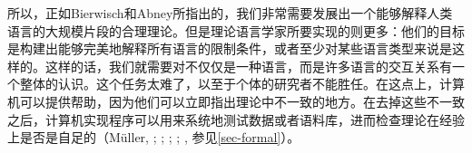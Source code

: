 所以，正如Bierwisch和Abney所指出的，我们非常需要发展出一个能够解释人类语言的大规模片段的合理理论。但是理论语言学家所要实现的则更多：他们的目标是构建出能够完美地解释所有语言的限制条件，或者至少对某些语言类型来说是这样的。这样的话，我们就需要对不仅仅是一种语言，而是许多语言的交互关系有一个整体的认识。这个任务太难了，以至于个体的研究者不能胜任。在这点上，计算机可以提供帮助，因为他们可以立即指出理论中不一致的地方。在去掉这些不一致之后，计算机实现程序可以用来系统地测试数据或者语料库，进而检查理论在经验上是否是自足的（Müller,
  \citeyear[\S~22]{Mueller99a}; \citeyear{MuellerCoreGram}; \citeyear{MuellerKernigkeit}; \citealp{OF98}; \citealp{Bender2008c}, 参见\ref{sec-formal}）。

